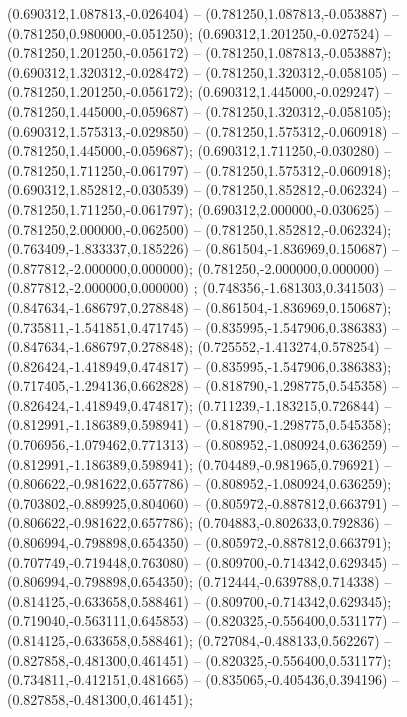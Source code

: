  (0.690312,1.087813,-0.026404) -- (0.781250,1.087813,-0.053887) -- (0.781250,0.980000,-0.051250);
 (0.690312,1.201250,-0.027524) -- (0.781250,1.201250,-0.056172) -- (0.781250,1.087813,-0.053887);
 (0.690312,1.320312,-0.028472) -- (0.781250,1.320312,-0.058105) -- (0.781250,1.201250,-0.056172);
 (0.690312,1.445000,-0.029247) -- (0.781250,1.445000,-0.059687) -- (0.781250,1.320312,-0.058105);
 (0.690312,1.575313,-0.029850) -- (0.781250,1.575312,-0.060918) -- (0.781250,1.445000,-0.059687);
 (0.690312,1.711250,-0.030280) -- (0.781250,1.711250,-0.061797) -- (0.781250,1.575312,-0.060918);
 (0.690312,1.852812,-0.030539) -- (0.781250,1.852812,-0.062324) -- (0.781250,1.711250,-0.061797);
 (0.690312,2.000000,-0.030625) -- (0.781250,2.000000,-0.062500) -- (0.781250,1.852812,-0.062324);
 (0.763409,-1.833337,0.185226) -- (0.861504,-1.836969,0.150687) -- (0.877812,-2.000000,0.000000);
 (0.781250,-2.000000,0.000000) -- (0.877812,-2.000000,0.000000) ;
 (0.748356,-1.681303,0.341503) -- (0.847634,-1.686797,0.278848) -- (0.861504,-1.836969,0.150687);
 (0.735811,-1.541851,0.471745) -- (0.835995,-1.547906,0.386383) -- (0.847634,-1.686797,0.278848);
 (0.725552,-1.413274,0.578254) -- (0.826424,-1.418949,0.474817) -- (0.835995,-1.547906,0.386383);
 (0.717405,-1.294136,0.662828) -- (0.818790,-1.298775,0.545358) -- (0.826424,-1.418949,0.474817);
 (0.711239,-1.183215,0.726844) -- (0.812991,-1.186389,0.598941) -- (0.818790,-1.298775,0.545358);
 (0.706956,-1.079462,0.771313) -- (0.808952,-1.080924,0.636259) -- (0.812991,-1.186389,0.598941);
 (0.704489,-0.981965,0.796921) -- (0.806622,-0.981622,0.657786) -- (0.808952,-1.080924,0.636259);
 (0.703802,-0.889925,0.804060) -- (0.805972,-0.887812,0.663791) -- (0.806622,-0.981622,0.657786);
 (0.704883,-0.802633,0.792836) -- (0.806994,-0.798898,0.654350) -- (0.805972,-0.887812,0.663791);
 (0.707749,-0.719448,0.763080) -- (0.809700,-0.714342,0.629345) -- (0.806994,-0.798898,0.654350);
 (0.712444,-0.639788,0.714338) -- (0.814125,-0.633658,0.588461) -- (0.809700,-0.714342,0.629345);
 (0.719040,-0.563111,0.645853) -- (0.820325,-0.556400,0.531177) -- (0.814125,-0.633658,0.588461);
 (0.727084,-0.488133,0.562267) -- (0.827858,-0.481300,0.461451) -- (0.820325,-0.556400,0.531177);
 (0.734811,-0.412151,0.481665) -- (0.835065,-0.405436,0.394196) -- (0.827858,-0.481300,0.461451);

